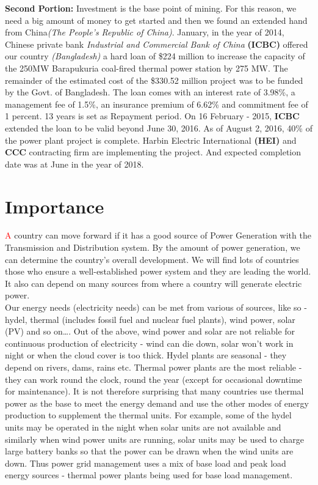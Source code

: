 \documentclass[11 pt]{article}
\begin{document}
\textbf{Second Portion:} Investment is the base point of mining. For this reason, we need a big amount of money to get started and then we found an extended hand from China\textit{(The People's Republic of China)}. January, in the year of 2014, Chinese private bank \textit{Industrial and Commercial Bank of China} \textbf{(ICBC)} offered our country \textit{(Bangladesh)} a hard loan of \$224 million to increase the capacity of the 250MW Barapukuria coal-fired thermal power station by 275 MW. The remainder of the estimated cost of the \$330.52 million project was to be funded by the Govt. of Bangladesh. The loan comes with an interest rate of 3.98\%, a management fee of 1.5\%, an insurance premium of 6.62\% and commitment fee of 1 percent. 13 years is set as Repayment period. On 16 February - 2015, \textbf{ICBC} extended the loan to be valid beyond June 30, 2016. As of August 2, 2016, 40\% of the power plant project is complete. Harbin Electric International \textbf{(HEI)} and \textbf{CCC} contracting firm are implementing the project. And expected completion date was at June in the year of 2018.

\section{Importance}
\hspace{5 mm} {\huge\textcolor{red}{A}} country can move forward if it has a good source of Power Generation with the Transmission and Distribution system. By the amount of power generation, we can determine the country’s overall development. We will find lots of countries those who ensure a well-established power system and they are leading the world. It also can depend on many sources from where a country will generate electric power.\\
Our energy needs (electricity needs) can be met from various of sources, like so - hydel, thermal (includes fossil fuel and nuclear fuel plants), wind power, solar (PV) and so on\dots. Out of the above, wind power and solar are not reliable for continuous production of electricity - wind can die down, solar won’t work in night or when the cloud cover is too thick. Hydel plants are seasonal - they depend on rivers, dams, rains etc. Thermal power plants are the most reliable - they can work round the clock, round the year (except for occasional downtime for maintenance). It is not therefore surprising that many countries use thermal power as the base to meet the energy demand and use the other modes of energy production to supplement the thermal units. For example, some of the hydel units may be operated in the night when solar units are not available and similarly when wind power units are running, solar units may be used to charge large battery banks so that the power can be drawn when the wind units are down. Thus power grid management uses a mix of base load and peak load energy sources - thermal power plants being used for base load management.
\end{document}
